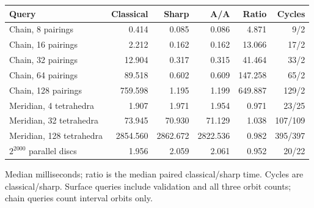 \begin{center}\small
\begin{tabular}{@{}lrrrrr@{}}
\toprule
Query & Classical & Sharp & A/A & Ratio & Cycles \\
\midrule
Chain, 8 pairings & 0.414 & 0.085 & 0.086 & 4.871 & 9/2 \\
Chain, 16 pairings & 2.212 & 0.162 & 0.162 & 13.066 & 17/2 \\
Chain, 32 pairings & 12.904 & 0.317 & 0.315 & 41.464 & 33/2 \\
Chain, 64 pairings & 89.518 & 0.602 & 0.609 & 147.258 & 65/2 \\
Chain, 128 pairings & 759.598 & 1.195 & 1.199 & 649.887 & 129/2 \\
Meridian, 4 tetrahedra & 1.907 & 1.971 & 1.954 & 0.971 & 23/25 \\
Meridian, 32 tetrahedra & 73.945 & 70.930 & 71.129 & 1.038 & 107/109 \\
Meridian, 128 tetrahedra & 2854.560 & 2862.672 & 2822.536 & 0.982 & 395/397 \\
$2^{2000}$ parallel discs & 1.956 & 2.059 & 2.061 & 0.952 & 20/22 \\
\bottomrule
\end{tabular}
\end{center}
Median milliseconds; ratio is the median paired classical/sharp time. Cycles are classical/sharp. Surface queries include validation and all three orbit counts; chain queries count interval orbits only.
